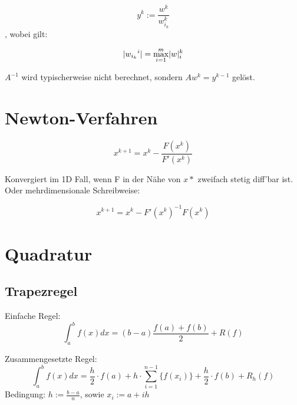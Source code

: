 \documentclass[11pt]{scrartcl}
\DeclarePairedDelimiter\abs{\lvert}{\rvert}%
\begin{document}
\begin{equation}
y^k:=\frac{w^k}{w_{i_k}^k}
\end{equation},
wobei gilt:

\begin{equation}
\abs{{w_{i_k}}^i}=\max_{i=1}^m\abs w_i^k
\end{equation}

$A^{-1}$ wird typischerweise nicht berechnet, sondern $Aw^k=y^{k-1}$ gelöst.

\pagebreak

\section{Newton-Verfahren}

\begin{equation}
x^{k+1}=x^k-\frac{F(x^k)}{F'(x^k)}
\end{equation}

Konvergiert im 1D Fall, wenn F in der Nähe von $x*$ zweifach stetig diff'bar ist.
Oder mehrdimensionale Schreibweise:

\begin{equation}
x^{k+1}=x^k-F'(x^k)^{-1}{F(x^k)}
\end{equation}

\pagebreak


\section{Quadratur}

\subsection{Trapezregel}

Einfache Regel:
\begin{equation}
{\int^b_a}{f(x) dx}=(b-a)\frac{f(a)+f(b)}{2}+R(f)
\end{equation}

Zusammengesetzte Regel:
\begin{equation}
{\int^b_a}{f(x) dx}=\frac{h}{2} \cdot f(a) + h \cdot {\sum_{i=1}^{n-1}} \{ f(x_i) \} + \frac{h}{2} \cdot f(b) + R_h(f)
\end{equation}
Bedingung: $h:=\frac{b-a}{n}$, sowie $x_i:=a+ih$
\end{document}
